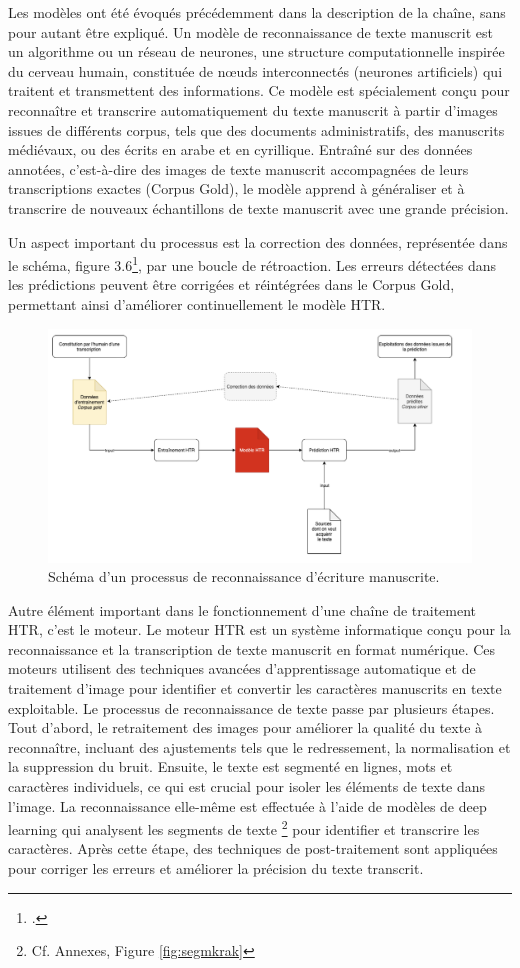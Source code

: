 \documentclass[a4paper,12pt,twoside]{book}
\begin{document}
	Les modèles ont été évoqués précédemment dans la description de la chaîne, sans pour autant être expliqué.  Un modèle de reconnaissance de texte manuscrit est un algorithme ou un réseau de neurones, une structure computationnelle inspirée du cerveau humain, constituée de nœuds interconnectés (neurones artificiels) qui traitent et transmettent des informations. Ce modèle est spécialement conçu pour reconnaître et transcrire automatiquement du texte manuscrit à partir d’images issues de différents corpus, tels que des documents administratifs, des manuscrits médiévaux, ou des écrits en arabe et en cyrillique. Entraîné sur des données annotées, c’est-à-dire des images de texte manuscrit accompagnées de leurs transcriptions exactes (Corpus Gold), le modèle apprend à généraliser et à transcrire de nouveaux échantillons de texte manuscrit avec une grande précision.
	
	Un aspect important du processus est la correction des données, représentée dans le schéma, figure 3.6\footcite{pinche_images_2022},  par une boucle de rétroaction. Les erreurs détectées dans les prédictions peuvent être corrigées et réintégrées dans le Corpus Gold, permettant ainsi d’améliorer continuellement le modèle HTR.
	\\
	\begin{figure}[H]
		\centering
		\includegraphics[width=0.7\linewidth]{images/schema_htr}
		\caption{Schéma d'un processus de reconnaissance d'écriture manuscrite.}
		\label{fig:schemhtr}
	\end{figure}
	
	Autre élément important dans le fonctionnement d’une chaîne de traitement HTR, c’est le moteur. Le moteur HTR est un système informatique conçu pour la reconnaissance et la transcription de texte manuscrit en format numérique. Ces moteurs utilisent des techniques avancées d’apprentissage automatique et de traitement d’image pour identifier et convertir les caractères manuscrits en texte exploitable. Le processus de reconnaissance de texte passe par plusieurs étapes. Tout d’abord, le retraitement des images pour améliorer la qualité du texte à reconnaître, incluant des ajustements tels que le redressement, la normalisation et la suppression du bruit. Ensuite, le texte est segmenté en lignes, mots et caractères individuels, ce qui est crucial pour isoler les éléments de texte dans l’image. La reconnaissance elle-même est effectuée à l’aide de modèles de deep learning qui analysent les segments de texte \footnote{Cf. Annexes, Figure \ref{fig:segmkrak}} pour identifier et transcrire les caractères. Après cette étape, des techniques de post-traitement sont appliquées pour corriger les erreurs et améliorer la précision du texte transcrit.
	\\
	
\end{document}
